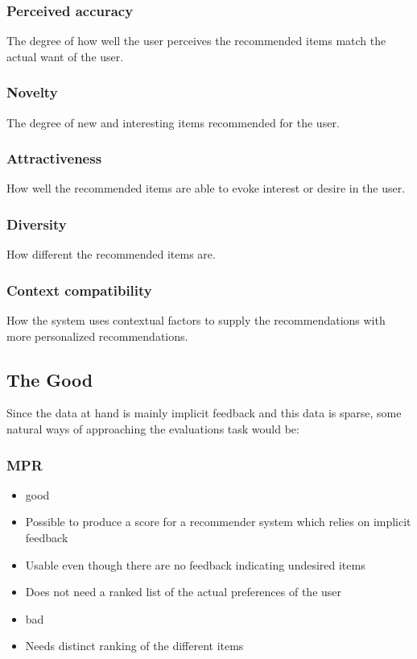 \subsubsection{Perceived accuracy}
The degree of how well the user perceives the recommended items match the actual want of the user.

\subsubsection{Novelty}
The degree of new and interesting items recommended for the user.

\subsubsection{Attractiveness}
How well the recommended items are able to evoke interest or desire in the user.

\subsubsection{Diversity}
How different the recommended items are.

\subsubsection{Context compatibility}
How the system uses contextual factors to supply the recommendations with more personalized recommendations.


\subsection{The Good}
Since the data at hand is mainly implicit feedback and this data is sparse, some natural ways of approaching the evaluations task would be:

\subsubsection{MPR}
\begin{itemize}
	\item good
	\item Possible to produce a score for a recommender system which relies on implicit feedback
	\item Usable even though there are no feedback indicating undesired items
	\item Does not need a ranked list of the actual preferences of the user
	\item bad
	\item Needs distinct ranking of the different items
\end{itemize}

